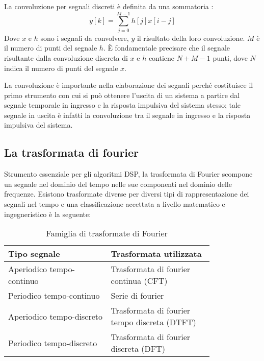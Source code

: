 La convoluzione per segnali discreti è definita da una sommatoria \cite[p.~120]{dspguide}:
\begin{equation}
    y[k] = \displaystyle\sum_{j=0}^{M-1}h[j]x[i-j]
    \label{eq:convoluzionediscreta}
\end{equation}
Dove $x$ e $h$ sono i segnali da convolvere, $y$ il risultato della loro convoluzione. $M$ è il numero di punti del segnale $h$. È fondamentale precisare che il segnale risultante dalla convoluzione discreta di $x$ e $h$ contiene $N+M-1$ punti, dove $N$ indica il numero di punti del segnale $x$.

La convoluzione è importante nella elaborazione dei segnali perché costituisce il primo strumento con cui si può ottenere l'uscita di un sistema a partire dal segnale temporale in ingresso e la risposta impulsiva del sistema stesso; tale segnale in uscita è infatti la convoluzione tra il segnale in ingresso e la risposta impulsiva del sistema.

\subsection{La trasformata di fourier}
Strumento essenziale per gli algoritmi DSP, la trasformata di Fourier scompone un segnale nel dominio del tempo nelle sue componenti nel dominio delle frequenze. Esistono trasformate diverse per diversi tipi di rappresentazione dei segnali nel tempo e una classificazione accettata a livello matematico e ingegneristico \cite[p.~144]{dspguide} è la seguente:

\begin{table}[H]
\begin{center}
\begin{small}
\begin{tabular}{p{0.4\linewidth} p{0.4\linewidth}}
    Tipo segnale & Trasformata utilizzata \\
    \hline
    Aperiodico tempo-continuo & Trasformata di fourier continua (CFT) \\
    Periodico tempo-continuo & Serie di fourier \\
    Aperiodico tempo-discreto & Trasformata di fourier tempo discreta (DTFT) \\
    Periodico tempo-discreto & Trasformata di fourier discreta (DFT)
\end{tabular}
\end{small}
\end{center}
\caption{Famiglia di trasformate di Fourier}
\end{table}

